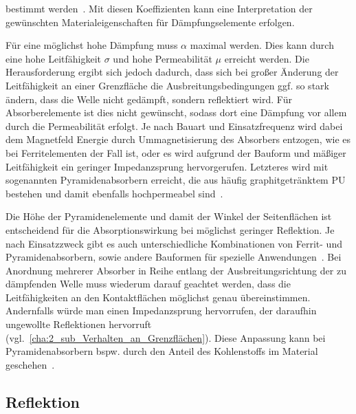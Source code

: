 bestimmt werden~\cite{EM_Schirmung}. Mit diesen Koeffizienten kann eine Interpretation der gewünschten Materialeigenschaften für Dämpfungselemente erfolgen. 
\par
\vspace{\linespace}
Für eine möglichst hohe Dämpfung muss $\alpha$ maximal werden. Dies kann durch eine hohe Leitfähigkeit $\sigma$ und hohe Permeabilität $\mu$ erreicht werden. Die Herausforderung ergibt sich jedoch dadurch, dass sich bei großer Änderung der Leitfähigkeit an einer Grenzfläche die Ausbreitungsbedingungen ggf. so stark ändern, dass die Welle nicht gedämpft, sondern reflektiert wird. Für Absorberelemente ist dies nicht gewünscht, sodass dort eine Dämpfung vor allem durch die Permeabilität erfolgt. Je nach Bauart und Einsatzfrequenz wird dabei dem Magnetfeld Energie durch Ummagnetisierung des Absorbers entzogen, wie es bei Ferritelementen der Fall ist, oder es wird aufgrund der Bauform und mäßiger Leitfähigkeit ein geringer Impedanzsprung hervorgerufen. Letzteres wird mit sogenannten Pyramidenabsorbern erreicht, die aus häufig graphitgetränktem \ac{PU} bestehen und damit ebenfalls hochpermeabel sind~\cite{EM_Schirmung}.
\par
\vspace{\linespace}
Die Höhe der Pyramidenelemente und damit der Winkel der Seitenflächen ist entscheidend für die Absorptionswirkung bei möglichst geringer Reflektion. Je nach Einsatzzweck gibt es auch unterschiedliche Kombinationen von Ferrit- und Pyramidenabsorbern, sowie andere Bauformen für spezielle Anwendungen~\cite{EMV-Support_Produktseite, Telemeter_Produktseite}. Bei Anordnung mehrerer Absorber in Reihe entlang der Ausbreitungsrichtung der zu dämpfenden Welle muss wiederum darauf geachtet werden, dass die Leitfähigkeiten an den Kontaktflächen möglichst genau übereinstimmen. Andernfalls würde man einen Impedanzsprung hervorrufen, der daraufhin ungewollte Reflektionen hervorruft (vgl.~\Abschnitt\ref{cha:2_sub_Verhalten_an_Grenzflächen}). Diese Anpassung kann bei Pyramidenabsorbern bspw. durch den Anteil des Kohlenstoffs im Material geschehen~\cite{EM_Schirmung}.




\subsection{Reflektion}\label{cha:2_sub_Reflektion}


